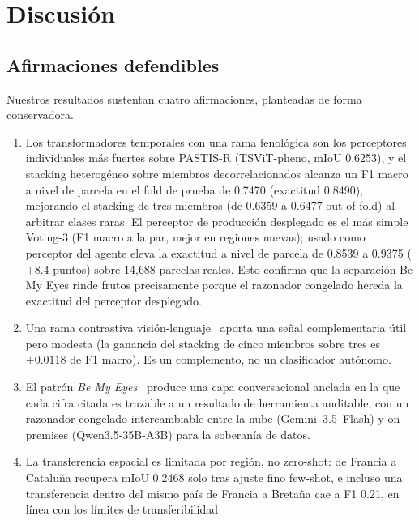 \section{Discusión}
\label{sec:discussion}

\subsection{Afirmaciones defendibles}
Nuestros resultados sustentan cuatro afirmaciones, planteadas de forma
conservadora.
\begin{enumerate}[leftmargin=*]
    \item Los transformadores temporales con una rama fenológica son los
    perceptores individuales más fuertes sobre PASTIS-R (TSViT-pheno,
    mIoU 0.6253), y el stacking heterogéneo sobre miembros
    decorrelacionados alcanza un F1 macro a nivel de parcela en el fold de
    prueba de 0.7470 (exactitud 0.8490), mejorando el stacking de tres
    miembros (de 0.6359 a 0.6477 out-of-fold) al arbitrar clases raras.
    El perceptor de producción desplegado es el más simple Voting-3 (F1
    macro a la par, mejor en regiones nuevas); usado como perceptor del
    agente eleva la exactitud a nivel de parcela de 0.8539 a 0.9375
    ($+8.4$ puntos) sobre 14{,}688 parcelas reales. Esto confirma que la
    separación Be My Eyes rinde frutos precisamente porque el razonador
    congelado hereda la exactitud del perceptor desplegado.
    \item Una rama contrastiva visión-lenguaje~\cite{li2025farslip}
    aporta una señal complementaria útil pero modesta (la ganancia del
    stacking de cinco miembros sobre tres es $+0.0118$ de F1 macro). Es
    un complemento, no un clasificador autónomo.
    \item El patrón \emph{Be My Eyes}~\cite{huang2025bemyeyes} produce
    una capa conversacional anclada en la que cada cifra citada es
    trazable a un resultado de herramienta auditable, con un razonador
    congelado intercambiable entre la nube (Gemini~3.5~Flash) y on-premises
    (Qwen3.5-35B-A3B) para la soberanía de datos.
    \item La transferencia espacial es limitada por región, no zero-shot:
    de Francia a Cataluña recupera mIoU 0.2468 solo tras ajuste fino
    few-shot, e incluso una transferencia dentro del mismo país de Francia
    a Bretaña cae a F1 0.21, en línea con los límites de transferibilidad

\end{enumerate}
